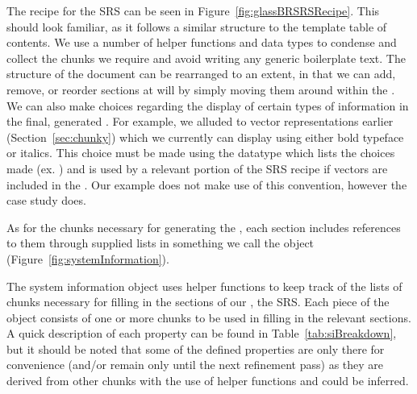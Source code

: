 The recipe for the \gb{} SRS can be seen in Figure~\ref{fig:glassBRSRSRecipe}.
This should look familiar, as it follows a similar structure to the \smithea{} 
template table of contents. We use a number of helper functions and data types 
to condense and collect the chunks we require and avoid writing any generic 
boilerplate text. The structure of the document can be rearranged to an extent, 
in that we can add, remove, or reorder sections at will by simply moving them 
around within the . We can also make choices regarding the 
display of certain types of information in the final, generated \sf{}. For 
example, we alluded to vector representations earlier 
(Section~\ref{sec:chunky}) which we currently can display using either bold
typeface or italics. This choice must be made using the  
datatype which lists the choices made (ex. 
) and is used by a relevant portion of the 
SRS recipe if vectors are included in the \sf{}. Our \gb{} example does not 
make use of this convention, however the \gp{} case study does.

As for the chunks necessary for generating the \sf{}, each section includes 
references to them through supplied lists in something we call the 
object (Figure~\ref{fig:systemInformation}).


The system information object uses helper functions to keep track of the lists 
of chunks necessary for filling in the sections of our \sf{}, the SRS. Each 
piece of the object consists of one or more chunks to be used in filling in the 
relevant sections. A quick description of each property can be found in 
Table~\ref{tab:siBreakdown}, but it should be noted that some of the defined 
properties are only there for convenience (and/or remain only until the next 
refinement pass) as they are derived from other chunks with the use of 
helper functions and could be inferred.


